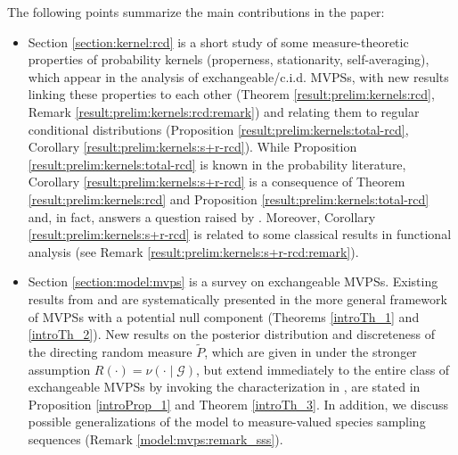 \documentclass[a4paper]{article}
\theoremstyle{plain}
\theoremstyle{remark}
\theoremstyle{definition}
\begin{document}
The following points summarize the main contributions in the paper:\vspace{0.2cm}
\begin{itemize}
\item Section \ref{section:kernel:rcd} is a short study of some measure-theoretic properties of probability kernels (properness, stationarity, self-averaging), which appear in the analysis of exchangeable/c.i.d. MVPSs, with new results linking these properties to each other (Theorem \ref{result:prelim:kernels:rcd}, Remark \ref{result:prelim:kernels:rcd:remark}) and relating them to regular conditional distributions (Proposition \ref{result:prelim:kernels:total-rcd}, Corollary \ref{result:prelim:kernels:s+r-rcd}). While Proposition \ref{result:prelim:kernels:total-rcd} is known in the probability literature, Corollary \ref{result:prelim:kernels:s+r-rcd} is a consequence of Theorem \ref{result:prelim:kernels:rcd} and Proposition \ref{result:prelim:kernels:total-rcd} and, in fact, answers a question raised by \citet[][p.\,11]{berti2023kernel}. Moreover, Corollary \ref{result:prelim:kernels:s+r-rcd} is related to some classical results in functional analysis (see Remark \ref{result:prelim:kernels:s+r-rcd:remark}).\vspace{0.2cm}

\item Section \ref{section:model:mvps} is a survey on exchangeable MVPSs. Existing results from \cite{sariev2024} and \cite{berti2023kernel} are systematically presented in the more general framework of MVPSs with a potential null component (Theorems \ref{introTh_1} and \ref{introTh_2}). New results on the posterior distribution and discreteness of the directing random measure $\tilde{P}$, which are given in \cite{berti2023kernel} under the stronger assumption $R(\cdot)=\nu(\cdot\mid\mathcal{G})$, but extend immediately to the entire class of exchangeable MVPSs by invoking the characterization in \cite{sariev2024}, are stated in Proposition \ref{introProp_1} and Theorem \ref{introTh_3}. In addition, we discuss possible generalizations of the model to measure-valued species sampling sequences (Remark \ref{model:mvps:remark_sss}).\vspace{0.2cm}


\end{itemize}
\end{document}
